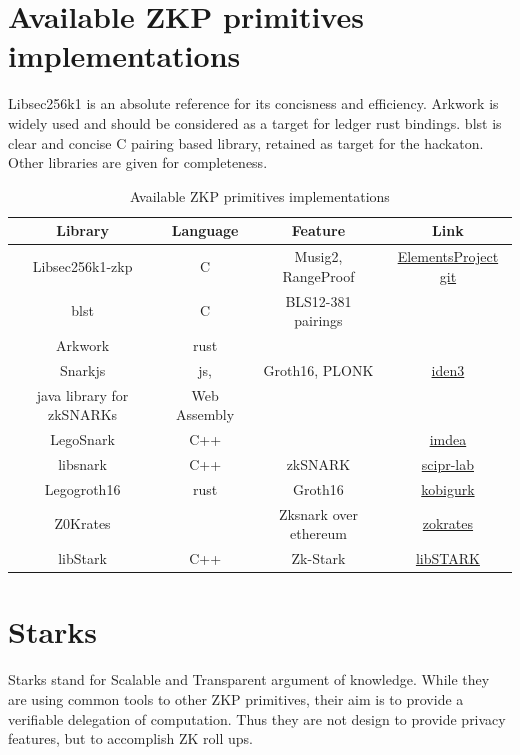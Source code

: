 \documentclass[11pt]{llncs2e/llncs}
\begin{document}
\section{Available ZKP primitives implementations}
Libsec256k1 is an absolute reference for its concisness and efficiency. Arkwork is widely used and should be considered as a target for ledger rust bindings. blst is clear and concise C pairing based library, retained as target for the hackaton. Other libraries are given for completeness. 
% 
 \begin{table}[h!]
 \begin{center}
 \begin{tabular}{|c|c|c|c|}
  \hline
  Library & Language &Feature & Link \\
  \hline
  Libsec256k1-zkp & C &Musig2, RangeProof & \href{https://github.com/ElementsProject/secp256k1-zkp/tree/master/src/modules}{ElementsProject git}\\
  \hline
  blst & C & BLS12-381 pairings & \\
  \hline
  Arkwork & rust & & \\
  \hline
  Snarkjs & js, &Groth16, PLONK \cite{plonk} & \href{https://github.com/iden3/snarkjs}{iden3}\\
  java library for zkSNARKs &Web Assembly&&\\
  \hline
  LegoSnark & C++ & \cite{LegoSnark} & \href{https://github.com/imdea-software/legosnark}{imdea}\\
  \hline 
  libsnark& C++ & zkSNARK & \href{https://github.com/scipr-lab/libsnark}{scipr-lab}\\
  \hline
Legogroth16& rust & Groth16& \href{https://github.com/kobigurk/legogro16}{kobigurk}\\
\hline
Z0Krates& & Zksnark over ethereum & \href{https://zokrates.github.io/introduction.html}{zokrates}\\ 
\hline
libStark & C++& Zk-Stark & \href{https://github.com/elibensasson/libSTARK}{libSTARK}\\

\hline
 \end{tabular} 
 \end{center}
 \caption{Available ZKP primitives implementations}
 \end{table}

\section{Starks}

Starks stand for Scalable and Transparent argument of knowledge. While they are using common tools to other ZKP primitives, their aim is to provide a verifiable delegation of computation. Thus they are not design to provide privacy features, but to accomplish ZK roll ups. 
\end{document}
